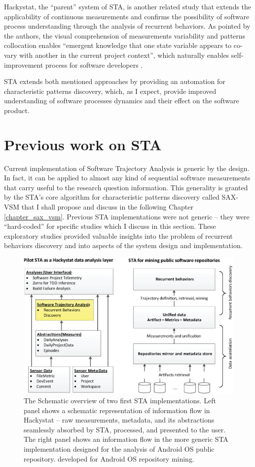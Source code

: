 Hackystat, the ``parent'' system of STA, is another related study that extends the applicability of continuous 
measurements and confirms the possibility of software process understanding through the analysis of recurrent 
behaviors\cite{citeulike:557296}. 
As pointed by the authors, the visual comprehension of measurements variability and patterns collocation enables 
``emergent knowledge that one state variable appears to co-vary with another in the current project context'',
which naturally enables self-improvement process for software developers \cite{citeulike:557296}. 

STA extends both mentioned approaches by providing an automation for characteristic patterns discovery, which, 
as I expect, provide improved understanding of software processes dynamics and their effect on the software product.

\section{Previous work on STA}
Current implementation of Software Trajectory Analysis is generic by the design. In fact, it can be applied to almost 
any kind of sequential software measurements that carry useful to the research question information. This generality is granted 
by the STA's core algorithm for characteristic patterns discovery called SAX-VSM that I shall propose and discuss in the 
following Chapter \ref{chapter_sax_vsm}. Previous STA implementations were not generic -- they were ``hard-coded'' 
for specific studies which I discuss in this section. These exploratory studies provided valuable insights into the problem 
of recurrent behaviors discovery and into aspects of the system design and implementation.

\begin{figure}[t]
   \centering
   \includegraphics[width=150mm]{figures/STA12-schema-draft.eps}
   \caption{The Schematic overview of two first STA implementations. 
   Left panel shows a schematic representation of information flow in Hackystat -- raw measurements, metadata, and its 
   abstractions seamlessly absorbed by STA, processed, and presented to the user.
   The right panel shows an information flow in the more generic STA implementation designed for the analysis of 
   Android OS public repository. developed for Android OS repository mining.}
   \label{fig:STA12-schema}
\end{figure}

